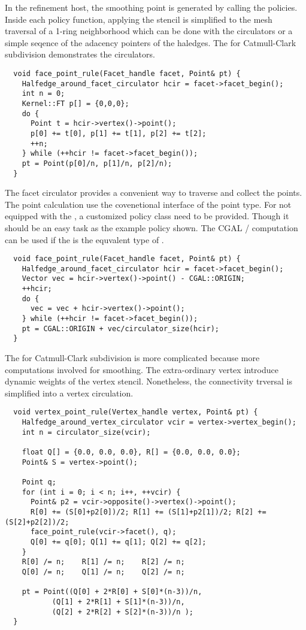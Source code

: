 In the refinement host, the smoothing point 
is generated by calling the policies. 
Inside each policy function, applying the 
stencil is simplified to the mesh traversal of a 
1-ring neighborhood which can be done with the 
circulators or a simple seqence of the adacency pointers 
of the haledges. The  for 
Catmull-Clark subdivision demonstrates the circulators. 
\begin{lstlisting}
  void face_point_rule(Facet_handle facet, Point& pt) {
    Halfedge_around_facet_circulator hcir = facet->facet_begin();
    int n = 0;
    Kernel::FT p[] = {0,0,0};
    do {
      Point t = hcir->vertex()->point();
      p[0] += t[0], p[1] += t[1], p[2] += t[2]; 
      ++n;
    } while (++hcir != facet->facet_begin());
    pt = Point(p[0]/n, p[1]/n, p[2]/n);
  }
\end{lstlisting}
The facet circulator provides a convenient way to
traverse and collect the points. The point calculation use
the covenetional interface \CodeFmt{[i]} of the point type. 
For  not equipped with
the \CodeFmt{[i]}, a customized policy class need to be 
provided. Though it should be an easy task as the example policy
shown. The CGAL /
computation can be used if the  is the equvalent
type of . 
\begin{lstlisting}
  void face_point_rule(Facet_handle facet, Point& pt) {
    Halfedge_around_facet_circulator hcir = facet->facet_begin();
    Vector vec = hcir->vertex()->point() - CGAL::ORIGIN;
    ++hcir;
    do {
      vec = vec + hcir->vertex()->point();
    } while (++hcir != facet->facet_begin());
    pt = CGAL::ORIGIN + vec/circulator_size(hcir);
  }
\end{lstlisting}

The  for Catmull-Clark subdivision
is more complicated because more computations involved for smoothing.
The extra-ordinary vertex introduce dynamic weights of the vertex 
stencil. Nonetheless, the connectivity trversal is simplified into
a vertex circulation.  
\begin{lstlisting}
  void vertex_point_rule(Vertex_handle vertex, Point& pt) {
    Halfedge_around_vertex_circulator vcir = vertex->vertex_begin();
    int n = circulator_size(vcir);    

    float Q[] = {0.0, 0.0, 0.0}, R[] = {0.0, 0.0, 0.0};
    Point& S = vertex->point();
    
    Point q;
    for (int i = 0; i < n; i++, ++vcir) {
      Point& p2 = vcir->opposite()->vertex()->point();
      R[0] += (S[0]+p2[0])/2; R[1] += (S[1]+p2[1])/2; R[2] += (S[2]+p2[2])/2;
      face_point_rule(vcir->facet(), q);
      Q[0] += q[0]; Q[1] += q[1]; Q[2] += q[2];
    }
    R[0] /= n;    R[1] /= n;    R[2] /= n;
    Q[0] /= n;    Q[1] /= n;    Q[2] /= n;
      
    pt = Point((Q[0] + 2*R[0] + S[0]*(n-3))/n,
	       (Q[1] + 2*R[1] + S[1]*(n-3))/n,
	       (Q[2] + 2*R[2] + S[2]*(n-3))/n );
  }
\end{lstlisting}

